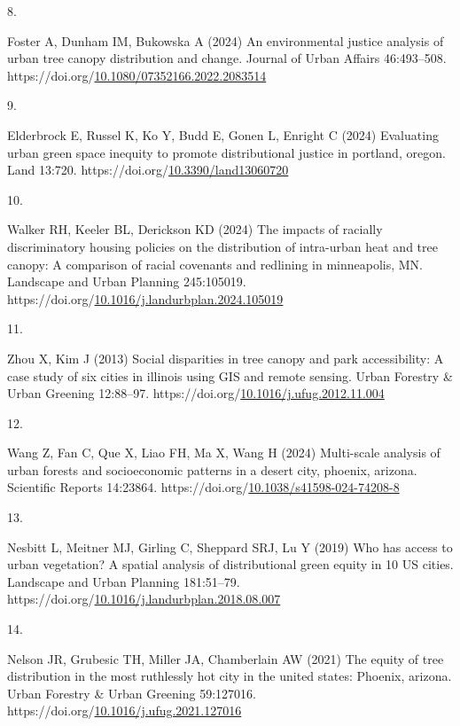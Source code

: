 \documentclass[
  sn-basic,
]{sn-jnl}
\newlength{\cslhangindent}
\newlength{\csllabelwidth}
\newenvironment{CSLReferences}[2] %
 {\begin{list}{}{%
  \setlength{\itemindent}{0pt}
  \setlength{\leftmargin}{0pt}
  \setlength{\parsep}{0pt}
  \ifodd #1
   \setlength{\leftmargin}{\cslhangindent}
   \setlength{\itemindent}{-1\cslhangindent}
  \fi
  \setlength{\itemsep}{#2\baselineskip}}}
 {\end{list}}
\newcommand{\CSLLeftMargin}[1]{\parbox[t]{\csllabelwidth}{\strut#1\strut}}
\newcommand{\CSLRightInline}[1]{\parbox[t]{\linewidth - \csllabelwidth}{\strut#1\strut}}
\begin{document}
\begin{CSLReferences}{0}{1}
\CSLLeftMargin{8. }%
\CSLRightInline{Foster A, Dunham IM, Bukowska A (2024) An environmental
justice analysis of urban tree canopy distribution and change. Journal
of Urban Affairs 46:493--508.
https://doi.org/\href{https://doi.org/10.1080/07352166.2022.2083514}{10.1080/07352166.2022.2083514}}

\CSLLeftMargin{9. }%
\CSLRightInline{Elderbrock E, Russel K, Ko Y, Budd E, Gonen L, Enright C
(2024) Evaluating urban green space inequity to promote distributional
justice in portland, oregon. Land 13:720.
https://doi.org/\href{https://doi.org/10.3390/land13060720}{10.3390/land13060720}}

\CSLLeftMargin{10. }%
\CSLRightInline{Walker RH, Keeler BL, Derickson KD (2024) The impacts of
racially discriminatory housing policies on the distribution of
intra-urban heat and tree canopy: A comparison of racial covenants and
redlining in minneapolis, MN. Landscape and Urban Planning 245:105019.
https://doi.org/\href{https://doi.org/10.1016/j.landurbplan.2024.105019}{10.1016/j.landurbplan.2024.105019}}

\CSLLeftMargin{11. }%
\CSLRightInline{Zhou X, Kim J (2013) Social disparities in tree canopy
and park accessibility: A case study of six cities in illinois using GIS
and remote sensing. Urban Forestry \& Urban Greening 12:88--97.
https://doi.org/\href{https://doi.org/10.1016/j.ufug.2012.11.004}{10.1016/j.ufug.2012.11.004}}

\CSLLeftMargin{12. }%
\CSLRightInline{Wang Z, Fan C, Que X, Liao FH, Ma X, Wang H (2024)
Multi-scale analysis of urban forests and socioeconomic patterns in a
desert city, phoenix, arizona. Scientific Reports 14:23864.
https://doi.org/\href{https://doi.org/10.1038/s41598-024-74208-8}{10.1038/s41598-024-74208-8}}

\CSLLeftMargin{13. }%
\CSLRightInline{Nesbitt L, Meitner MJ, Girling C, Sheppard SRJ, Lu Y
(2019) Who has access to urban vegetation? A spatial analysis of
distributional green equity in 10 US cities. Landscape and Urban
Planning 181:51--79.
https://doi.org/\href{https://doi.org/10.1016/j.landurbplan.2018.08.007}{10.1016/j.landurbplan.2018.08.007}}

\CSLLeftMargin{14. }%
\CSLRightInline{Nelson JR, Grubesic TH, Miller JA, Chamberlain AW (2021)
The equity of tree distribution in the most ruthlessly hot city in the
united states: Phoenix, arizona. Urban Forestry \& Urban Greening
59:127016.
https://doi.org/\href{https://doi.org/10.1016/j.ufug.2021.127016}{10.1016/j.ufug.2021.127016}}


\end{CSLReferences}
\end{document}
